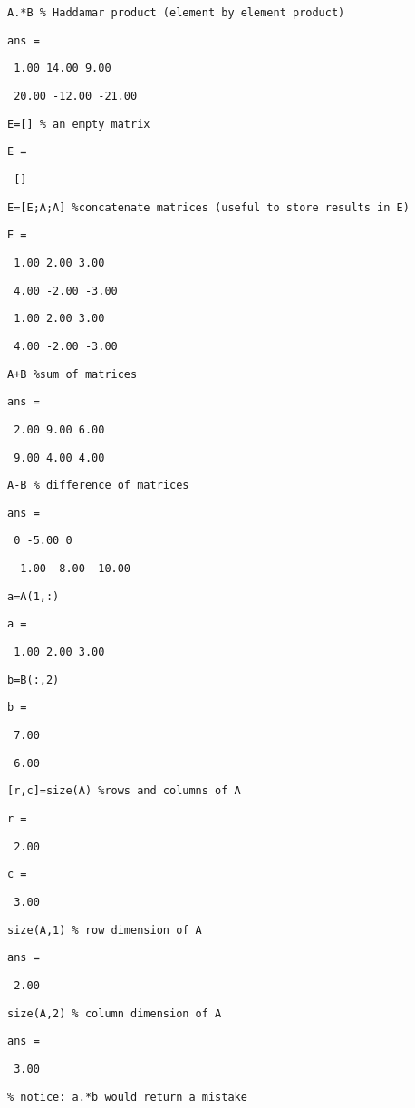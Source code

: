 \documentclass[12pt,a4paper]{article}
\begin{document}
\texttt{A.*B \% Haddamar product (element by element product)}

\texttt{ans =}

\texttt{\ 1.00 14.00 9.00}

\texttt{\ 20.00 -12.00 -21.00}

\texttt{E=[] \% an empty matrix}

\texttt{E =}

\texttt{\ []}

\texttt{E=[E;A;A] \%concatenate matrices (useful to store results in E)}

\texttt{E =}

\texttt{\ 1.00 2.00 3.00}

\texttt{\ 4.00 -2.00 -3.00}

\texttt{\ 1.00 2.00 3.00}

\texttt{\ 4.00 -2.00 -3.00}

\texttt{A+B \%sum of matrices}

\texttt{ans =}

\texttt{\ 2.00 9.00 6.00}

\texttt{\ 9.00 4.00 4.00}

\texttt{A-B \% difference of matrices}

\texttt{ans =}

\texttt{\ 0 -5.00 0}

\texttt{\ -1.00 -8.00 -10.00}

\texttt{a=A(1,:)}

\texttt{a =}

\texttt{\ 1.00 2.00 3.00}

\texttt{b=B(:,2)}

\texttt{b =}

\texttt{\ 7.00}

\texttt{\ 6.00}

\texttt{[r,c]=size(A) \%rows and columns of A}

\texttt{r =}

\texttt{\ 2.00}

\texttt{c =}

\texttt{\ 3.00}

\texttt{size(A,1) \% row dimension of A}

\texttt{ans =}

\texttt{\ 2.00}

\texttt{size(A,2) \% column dimension of A}

\texttt{ans =}

\texttt{\ 3.00}

\texttt{\% notice: a.*b would return a mistake}
\end{document}
